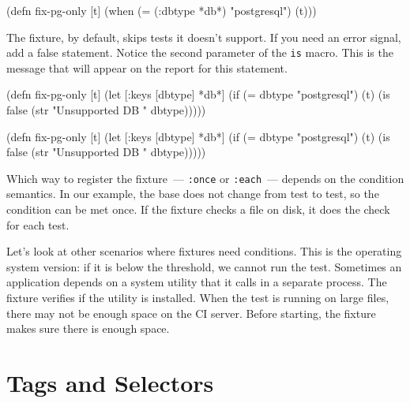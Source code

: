 \begin{english}
  \begin{clojure}
(defn fix-pg-only [t]
  (when (= (:dbtype *db*) "postgresql")
    (t)))
  \end{clojure}
\end{english}

The fixture, by default, skips tests it doesn't support. If you need an error signal, add a false statement. Notice the second parameter of the \verb|is| macro. This is the message that will appear on the report for this statement.

\ifnarrow

\begin{english}
  \begin{clojure}
(defn fix-pg-only [t]
  (let [{:keys [dbtype]} *db*]
    (if (= dbtype "postgresql")
      (t)
      (is false
        (str "Unsupported DB "
          dbtype)))))
  \end{clojure}
\end{english}

\else

\begin{english}
  \begin{clojure}
(defn fix-pg-only [t]
  (let [{:keys [dbtype]} *db*]
    (if (= dbtype "postgresql")
      (t)
      (is false (str "Unsupported DB " dbtype)))))
  \end{clojure}
\end{english}

\fi

Which way to register the fixture~--- \verb|:once| or \verb|:each|~--- depends on the condition semantics. In our example, the base does not change from test to test, so the condition can be met once. If the fixture checks a file on disk, it does the check for each test.

Let's look at other scenarios where fixtures need conditions. This is the operating system version: if it is below the threshold, we cannot run the test. Sometimes an application depends on a system utility that it calls in a separate process. The fixture verifies if the utility is installed. When the test is running on large files, there may not be enough space on the CI server. Before starting, the fixture makes sure there is enough space.

\section{Tags and Selectors}

